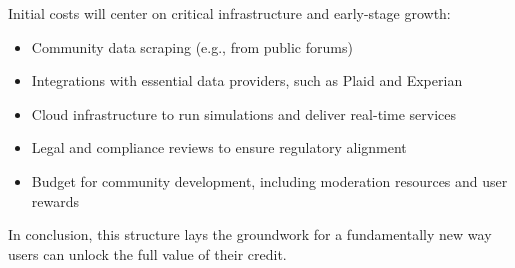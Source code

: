 Initial costs will center on critical infrastructure and early-stage growth:
\vspace{-0.5em}
\begin{itemize}[noitemsep]
\item Community data scraping (e.g., from public forums)
\item Integrations with essential data providers, such as Plaid and Experian
\item Cloud infrastructure to run simulations and deliver real-time services
\item Legal and compliance reviews to ensure regulatory alignment
\item Budget for community development, including moderation resources and user rewards
\end{itemize}
\vspace{-0.5em}

In conclusion, this structure lays the groundwork for a fundamentally new way users can unlock the full value of their credit.
